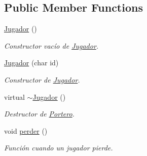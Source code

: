\subsection*{Public Member Functions}
\begin{DoxyCompactItemize}
\item 
\hypertarget{class_jugador_a232c46f75691af6210096e5972535d71}{\hyperlink{class_jugador_a232c46f75691af6210096e5972535d71}{Jugador} ()}\label{class_jugador_a232c46f75691af6210096e5972535d71}

\begin{DoxyCompactList}\small\item\em Constructor vacío de \hyperlink{class_jugador}{Jugador}. \end{DoxyCompactList}\item 
\hypertarget{class_jugador_ac3ba0a32d09db7367efe4cd9e019e41d}{\hyperlink{class_jugador_ac3ba0a32d09db7367efe4cd9e019e41d}{Jugador} (char id)}\label{class_jugador_ac3ba0a32d09db7367efe4cd9e019e41d}

\begin{DoxyCompactList}\small\item\em Constructor de \hyperlink{class_jugador}{Jugador}. \end{DoxyCompactList}\item 
\hypertarget{class_jugador_a9db1d422fe3b675f92d9fd687b1f42c4}{virtual \hyperlink{class_jugador_a9db1d422fe3b675f92d9fd687b1f42c4}{$\sim$\+Jugador} ()}\label{class_jugador_a9db1d422fe3b675f92d9fd687b1f42c4}

\begin{DoxyCompactList}\small\item\em Destructor de \hyperlink{class_portero}{Portero}. \end{DoxyCompactList}\item 
\hypertarget{class_jugador_ad483ad724147364ee91a822f471c09b2}{void \hyperlink{class_jugador_ad483ad724147364ee91a822f471c09b2}{perder} ()}\label{class_jugador_ad483ad724147364ee91a822f471c09b2}

\begin{DoxyCompactList}\small\item\em Función cuando un jugador pierde. \end{DoxyCompactList}\end{DoxyCompactItemize}
